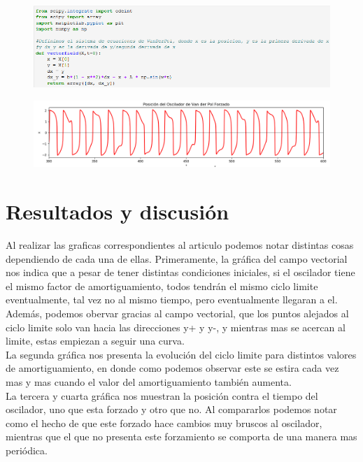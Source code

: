 \documentclass[12pt]{article}
\begin{document}
\begin{figure}[h!]
    \centering
\includegraphics[width=5in]{Cod3.png}
\end{figure}

\begin{figure}[h!]
    \centering
\includegraphics[width=6in]{Im4.png}
\end{figure}

\section{Resultados y discusión}
Al realizar las graficas correspondientes al articulo podemos notar distintas cosas dependiendo de cada una de ellas. Primeramente, la gráfica del campo vectorial nos indica que a pesar de tener distintas condiciones iniciales, si el oscilador tiene el mismo factor de amortiguamiento, todos tendrán el mismo ciclo limite eventualmente, tal vez no al mismo tiempo, pero eventualmente llegaran a el. Además, podemos obervar gracias al campo vectorial, que los puntos alejados al ciclo limite solo van hacia las direcciones y+ y y-, y mientras mas se acercan al limite, estas empiezan a seguir una curva. \\

La segunda gráfica nos presenta la evolución del ciclo limite para distintos valores de amortiguamiento, en donde como podemos observar este se estira cada vez mas y mas cuando el valor del amortiguamiento también aumenta. \\

La tercera y cuarta gráfica nos muestran la posición contra el tiempo del oscilador, uno que esta forzado y otro que no. Al compararlos podemos notar como el hecho de que este forzado hace cambios muy bruscos al oscilador, mientras que el que no presenta este forzamiento se comporta de una manera mas periódica. 
\end{document}
